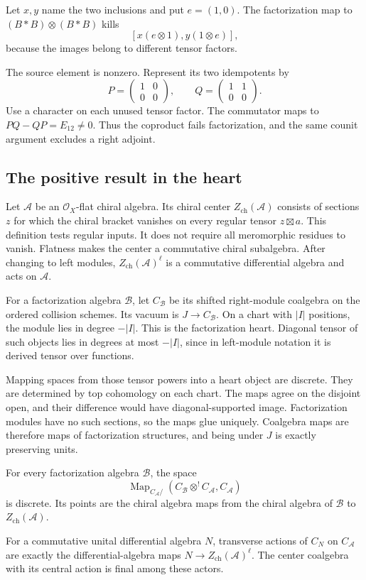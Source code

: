 Let $x,y$ name
the two inclusions
and put $e=(1,0)$.
The factorization
map to
$(B*B)\otimes(B*B)$
kills
\[
 [x(e\otimes1),y(1\otimes e)],
\]
because the images
belong to different
tensor factors.

The source element
is nonzero. Represent
its two idempotents
by
\[
 P=\begin{pmatrix}1&0\\0&0\end{pmatrix},
 \qquad
 Q=\begin{pmatrix}1&1\\0&0\end{pmatrix}.
\]
Use a character
on each unused
tensor factor.
The commutator
maps to
$PQ-QP=E_{12}\ne0$.
Thus the coproduct
fails factorization,
and the same
counit argument
excludes a right
adjoint.

\subsection{The positive result in the heart}
\label{v4-arith:centers:subsec:heart}

Let $\mathcal A$
be an
$\mathcal O_X$-flat
chiral algebra.
Its chiral center
$Z_{\mathrm{ch}}(\mathcal A)$
consists of sections
$z$ for which the
chiral bracket
vanishes on every
regular tensor
$z\boxtimes a$.
This definition
tests regular
inputs. It does
not require all
meromorphic
residues to vanish.
Flatness makes
the center a
commutative chiral
subalgebra.
After changing to
left modules,
$Z_{\mathrm{ch}}(\mathcal A)^\ell$
is a commutative
differential algebra
and acts on
$\mathcal A$.

For a factorization
algebra $\mathcal B$,
let $C_{\mathcal B}$
be its shifted
right-module
coalgebra on the
ordered collision
schemes. Its vacuum
is $J\to C_{\mathcal B}$.
On a chart with
$|I|$ positions,
the module lies
in degree $-|I|$.
This is the
factorization heart.
Diagonal tensor
of such objects
lies in degrees
at most $-|I|$,
since in left-module
notation it is
derived tensor
over functions.

Mapping spaces
from those tensor
powers into a
heart object
are discrete.
They are determined
by top cohomology
on each chart.
The maps agree
on the disjoint
open, and their
difference would
have diagonal-supported
image. Factorization
modules have no
such sections,
so the maps
glue uniquely.
Coalgebra maps
are therefore
maps of factorization
structures, and
being under $J$
is exactly
preserving units.

\begin{theorem}\label{v4-arith:centers:thm:heart}
For every factorization
algebra $\mathcal B$,
the space
\[
 \operatorname{Map}_{C_{\mathcal A}/}
       (C_{\mathcal B}\otimes^!C_{\mathcal A},C_{\mathcal A})
\]
is discrete. Its
points are the
chiral algebra
maps from the
chiral algebra
of $\mathcal B$
to
$Z_{\mathrm{ch}}(\mathcal A)$.

For a commutative
unital differential
algebra $N$,
transverse actions
of $C_N$ on
$C_{\mathcal A}$
are exactly
the differential-algebra
maps
$N\to Z_{\mathrm{ch}}(\mathcal A)^\ell$.
The center coalgebra
with its central
action is final
among these actors.
\end{theorem}

